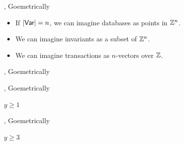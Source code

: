 \documentclass[xcolor={dvipsnames,svgnames,table}]{beamer}
\begin{document}
\begin{frame}{\iconfluence{}, Goemetrically}
  \begin{itemize}
    \item
      If $|\textsf{Var}| = n$, we can imagine databases as points in $\mathbb{Z}^n$.
    \item
      We can imagine invariants as a subset of $\mathbb{Z}^n$.
    \item
      We can imagine transactions as $n$-vectors over $\mathbb{Z}$.
  \end{itemize}
\end{frame}

\newcommand{\ymin}{-1}
\newcommand{\ymax}{4}
\newcommand{\xmin}{-4}
\newcommand{\xmax}{4}
\newcommand{\drawgrid}{
  \draw[opacity=0.5] (\xmin, \ymin) grid (\xmax, \ymax);
  \draw[ultra thick] (\xmin, 0) -- (\xmax, 0);
  \draw[ultra thick] (0, \ymin) -- (0, \ymax);
}
\newcommand{\drawpoints}[1]{
  \foreach \x in {\xmin, ..., \xmax} {
    \foreach \y in {\ymin, ..., \ymax} {
      \ifboolexpr{#1}{
        \node[shape=circle, fill, opacity=0.75, inner sep=3pt] (\x-\y) at (\x, \y) {};
      }{}
    }
  }
}

\begin{frame}{\iconfluence{}, Goemetrically}
  \begin{center}
  \end{center}
\end{frame}

\begin{frame}{\iconfluence{}, Goemetrically}
  \begin{center}
    $y \geq 1$

  \end{center}
\end{frame}

\begin{frame}{\iconfluence{}, Goemetrically}
  \begin{center}
    $y \geq 3$

  \end{center}
\end{frame}
\end{document}
